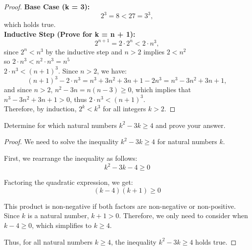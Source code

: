 \documentclass[12pt]{article}
\newenvironment{customprop}[1]{
  \renewcommand\theproposition{#1}
  \proposition
}{\endproposition}
\begin{document}
\begin{proof}  
  \textbf{Base Case (k = 3):}
  \[
  2^3 = 8 < 27 = 3^3,
  \]
  which holds true.\\
  
  \noindent  
  \textbf{Inductive Step (Prove for k = n + 1):}
  \[
  2^{n+1} = 2 \cdot 2^n < 2 \cdot n^3,
  \]
  since \( 2^n < n^3 \) by the inductive step and \( n > 2 \) implies \( 2 < n^2 \) \\
  so \( 2 \cdot n^3 < n^2 \cdot n^3 = n^5 \) \\
  \( 2 \cdot n^3 < (n+1)^3 \). Since \( n > 2 \), we have:
  \[
  (n+1)^3 - 2 \cdot n^3 = n^3 + 3n^2 + 3n + 1 - 2n^3 = n^3 - 3n^2 + 3n + 1,
  \]
  and since \( n > 2 \), \( n^2 - 3n = n(n - 3) \geq 0 \), which implies that \( n^3 - 3n^2 + 3n + 1 > 0 \), thus \( 2 \cdot n^3 < (n+1)^3 \). \\
  Therefore, by induction, \( 2^k < k^3 \) for all integers \( k > 2 \).
  \end{proof}


\begin{customprop}{2.28}
  Determine for which natural numbers \( k^2 - 3k \geq 4 \) and prove your answer.
\end{customprop}

\begin{proof}
  We need to solve the inequality \( k^2 - 3k \geq 4 \) for natural numbers \( k \).
  
  First, we rearrange the inequality as follows:
  \[
  k^2 - 3k - 4 \geq 0
  \]
  
  Factoring the quadratic expression, we get:
  \[
  (k - 4)(k + 1) \geq 0
  \]
  
  This product is non-negative if both factors are non-negative or non-positive. Since \( k \) is a natural number, \( k + 1 > 0 \). Therefore, we only need to consider when \( k - 4 \geq 0 \), which simplifies to \( k \geq 4 \).
  
  Thus, for all natural numbers \( k \geq 4 \), the inequality \( k^2 - 3k \geq 4 \) holds true.
  \end{proof}
  
\end{document}

